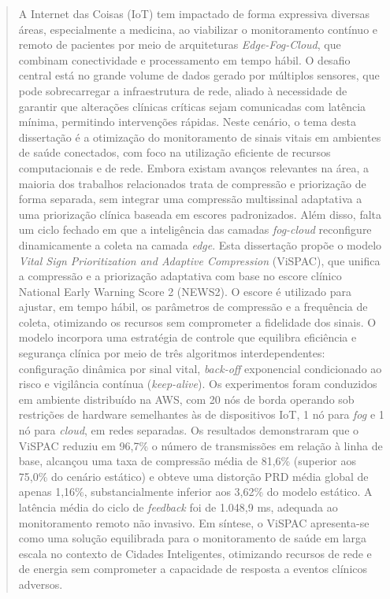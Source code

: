 \documentclass[twoside,english,brazilian]{UNISINOSmonografia}
\begin{document}
%
\begin{abstract}
A Internet das Coisas (IoT) tem impactado de forma expressiva diversas áreas, especialmente a medicina, ao viabilizar o monitoramento contínuo e remoto de pacientes por meio de arquiteturas \textit{Edge-Fog-Cloud}, que combinam conectividade e processamento em tempo hábil. O desafio central está no grande volume de dados gerado por múltiplos sensores, que pode sobrecarregar a infraestrutura de rede, aliado à necessidade de garantir que alterações clínicas críticas sejam comunicadas com latência mínima, permitindo intervenções rápidas. Neste cenário, o tema desta dissertação é a otimização do monitoramento de sinais vitais em ambientes de saúde conectados, com foco na utilização eficiente de recursos computacionais e de rede. Embora existam avanços relevantes na área, a maioria dos trabalhos relacionados trata de compressão e priorização de forma separada, sem integrar uma compressão multissinal adaptativa a uma priorização clínica baseada em escores padronizados. Além disso, falta um ciclo fechado em que a inteligência das camadas \textit{fog-cloud} reconfigure dinamicamente a coleta na camada \textit{edge}. Esta dissertação propõe o modelo \textit{Vital Sign Prioritization and Adaptive Compression} (ViSPAC), que unifica a compressão e a priorização adaptativa com base no escore clínico National Early Warning Score 2 (NEWS2). O escore é utilizado para ajustar, em tempo hábil, os parâmetros de compressão e a frequência de coleta, otimizando os recursos sem comprometer a fidelidade dos sinais. O modelo incorpora uma estratégia de controle que equilibra eficiência e segurança clínica por meio de três algoritmos interdependentes: configuração dinâmica por sinal vital, \textit{back-off} exponencial condicionado ao risco e vigilância contínua (\textit{keep-alive}). Os experimentos foram conduzidos em ambiente distribuído na AWS, com 20 nós de borda operando sob restrições de hardware semelhantes às de dispositivos IoT, 1 nó para \textit{fog} e 1 nó para \textit{cloud}, em redes separadas. Os resultados demonstraram que o ViSPAC reduziu em 96,7\% o número de transmissões em relação à linha de base, alcançou uma taxa de compressão média de 81,6\% (superior aos 75,0\% do cenário estático) e obteve uma distorção PRD média global de apenas 1,16\%, substancialmente inferior aos 3,62\% do modelo estático. A latência média do ciclo de \textit{feedback} foi de 1.048,9 ms, adequada ao monitoramento remoto não invasivo. Em síntese, o ViSPAC apresenta-se como uma solução equilibrada para o monitoramento de saúde em larga escala no contexto de Cidades Inteligentes, otimizando recursos de rede e de energia sem comprometer a capacidade de resposta a eventos clínicos adversos.
\end{abstract}
\end{document}
